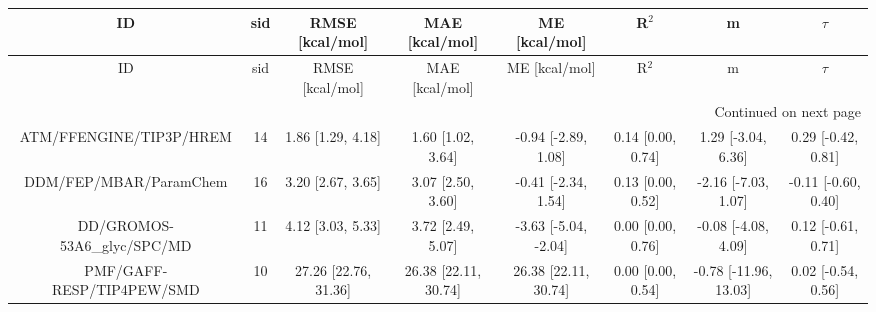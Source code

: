 \documentclass[8pt]{article}
\begin{document}
\begin{center}
\begin{footnotesize}
\begin{longtable}{|cccccccc|}
\toprule
                         ID & sid &      RMSE [kcal/mol] &       MAE [kcal/mol] &        ME [kcal/mol] &             R$^2$ &                     m &              $\tau$ \\
\midrule
\endfirsthead

\toprule
                         ID & sid &      RMSE [kcal/mol] &       MAE [kcal/mol] &        ME [kcal/mol] &             R$^2$ &                     m &              $\tau$ \\
\midrule
\endhead
\midrule
\multicolumn{8}{r}{{Continued on next page}} \\
\midrule
\endfoot

\bottomrule
\endlastfoot
    ATM/FFENGINE/TIP3P/HREM &  14 &    1.86 [1.29, 4.18] &    1.60 [1.02, 3.64] &  -0.94 [-2.89, 1.08] & 0.14 [0.00, 0.74] &    1.29 [-3.04, 6.36] &  0.29 [-0.42, 0.81] \\
     DDM/FEP/MBAR/ParamChem &  16 &    3.20 [2.67, 3.65] &    3.07 [2.50, 3.60] &  -0.41 [-2.34, 1.54] & 0.13 [0.00, 0.52] &   -2.16 [-7.03, 1.07] & -0.11 [-0.60, 0.40] \\
DD/GROMOS-53A6\_glyc/SPC/MD &  11 &    4.12 [3.03, 5.33] &    3.72 [2.49, 5.07] & -3.63 [-5.04, -2.04] & 0.00 [0.00, 0.76] &   -0.08 [-4.08, 4.09] &  0.12 [-0.61, 0.71] \\
  PMF/GAFF-RESP/TIP4PEW/SMD &  10 & 27.26 [22.76, 31.36] & 26.38 [22.11, 30.74] & 26.38 [22.11, 30.74] & 0.00 [0.00, 0.54] & -0.78 [-11.96, 13.03] &  0.02 [-0.54, 0.56] \\
\end{longtable}
\end{footnotesize}
\end{center}
\end{document}
